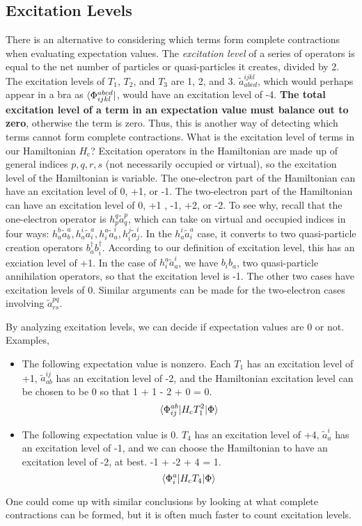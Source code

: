 \documentclass{article}
\newcommand{\Hc}{H_{\mathrm{c}}}
\begin{document}
\subsection{Excitation Levels}
There is an alternative to considering which terms form complete contractions when
evaluating expectation values. 
The \textit{excitation level} of a series of operators is equal 
to the net number of particles or quasi-particles it creates, divided by 2.
The excitation levels of $T_1$, $T_2$, and $T_3$ are 1, 2, and 3.
$\tilde{a}_{abcd}^{ijkl}$, which would perhaps appear in a bra as
$\bra{\Phi_{ijkl}^{abcd}}$, would have an excitation level of -4.
\textbf{The total excitation level of a term in an expectation value must balance out
to zero}, otherwise the term is zero. 
Thus, this is another way of detecting which terms cannot form complete contractions.
What is the excitation level of terms in our Hamiltonian $\Hc$?
Excitation operators in the Hamiltonian are made up of general indices $p,q,r,s$ (not necessarily occupied or virtual), so the excitation level of the Hamiltonian is variable.
The one-electron part of the Hamiltonian can have an excitation level of 0, +1, or -1. 
The two-electron part of the Hamiltonian can have an excitation level of 0, +1 , -1, +2, or -2.  
To see why, recall that the one-electron operator is $h_p^q \tilde{a}_q^p$, which
can take on virtual and occupied indices in four ways: 
$h_a^b \tilde{a}_b^a, h_a^i \tilde{a}_i^a, h_i^a \tilde{a}_a^i, h_i^j \tilde{a}_j^i$.
In the $ h_a^i \tilde{a}_i^a$ case, it converts to two quasi-particle 
creation operators $b_a^\dagger b_i^\dagger$. According to our definition of excitation
level, this has an exciation level of +1. In the case of $ h_i^a \tilde{a}_a^i $,
we have $b_i b_a $, two quasi-particle annihilation operators, so that the excitation
level is -1. 
The other two cases have excitation levels of 0.
Similar arguments can be made for the two-electron cases involving $\tilde{a}_{rs}^{pq}$.

By analyzing excitation levels, we can decide if expectation values are 0 or not.
Examples,
\begin{itemize}
\item The following expectation value is nonzero. Each $T_1$ has an excitation
level of +1, $\tilde{a}_{ab}^{ij}$ has an excitation level of -2, and the Hamiltonian
excitation level can be chosen to be 0 so that 1 + 1 - 2 + 0 = 0.
\[ \braket{\Phi_{ij}^{ab} | \Hc T_1^2 | \Phi} \] 
\item The following expectation value is 0. $T_4$ has an excitation level of +4,
$\tilde{a}_{a}^{i}$ has an excitation level of -1, and we can choose 
the Hamiltonian to have an excitation level of -2, at best. -1 + -2 + 4 = 1.
\[ \braket{\Phi_i^a | \Hc T_4 | \Phi} \] 
\end{itemize}
One could come up with similar conclusions by looking at what complete contractions
can be formed, but it is often much faster to count excitation levels.
\end{document}
